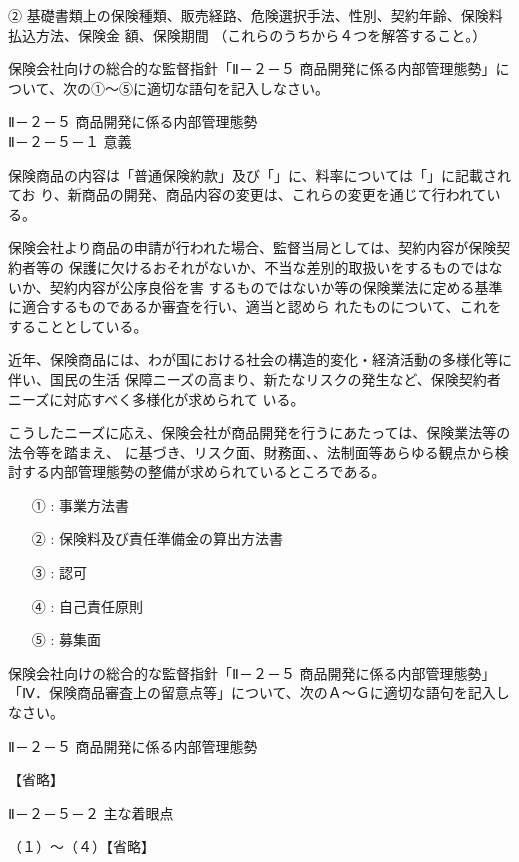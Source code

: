 \documentclass[report,gutter=10mm,fore-edge=10mm,uplatex,dvipdfmx]{jlreq}
\begin{document}
② 基礎書類上の保険種類、販売経路、危険選択手法、性別、契約年齢、保険料払込方法、保険金
額、保険期間 （これらのうちから４つを解答すること。）

保険会社向けの総合的な監督指針「Ⅱ－２－５ 商品開発に係る内部管理態勢」について、次の①～⑤に適切な語句を記入しなさい。

\noindent{}Ⅱ－２－５ 商品開発に係る内部管理態勢\\
Ⅱ－２－５－１ 意義

保険商品の内容は「普通保険約款」及び「」に、料率については「」に記載されてお
り、新商品の開発、商品内容の変更は、これらの変更を通じて行われている。

保険会社より商品の申請が行われた場合、監督当局としては、契約内容が保険契約者等の
保護に欠けるおそれがないか、不当な差別的取扱いをするものではないか、契約内容が公序良俗を害
するものではないか等の保険業法に定める基準に適合するものであるか審査を行い、適当と認めら
れたものについて、これをすることとしている。

近年、保険商品には、わが国における社会の構造的変化・経済活動の多様化等に伴い、国民の生活
保障ニーズの高まり、新たなリスクの発生など、保険契約者ニーズに対応すべく多様化が求められて
いる。

こうしたニーズに応え、保険会社が商品開発を行うにあたっては、保険業法等の法令等を踏まえ、
に基づき、リスク面、財務面、、法制面等あらゆる観点から検討する内部管理態勢の整備が求められているところである。

\answer{}
\begin{itemize}
\item[ ① :] 事業方法書
\item[ ② :] 保険料及び責任準備金の算出方法書
\item[ ③ :] 認可
\item[ ④ :] 自己責任原則
\item[ ⑤ :] 募集面
\end{itemize}


保険会社向けの総合的な監督指針「Ⅱ－２－５ 商品開発に係る内部管理態勢」
「Ⅳ．保険商品審査上の留意点等」について、次のＡ〜Ｇに適切な語句を記入しなさい。

Ⅱ－２－５ 商品開発に係る内部管理態勢

【省略】

Ⅱ－２－５－２ 主な着眼点

（１）～（４）【省略】
\end{document}
